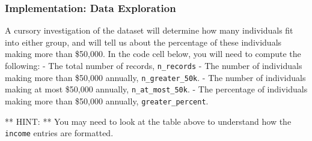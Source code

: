\documentclass[11pt]{article}
\begin{document}
    
    \subsubsection{Implementation: Data
Exploration}\label{implementation-data-exploration}

A cursory investigation of the dataset will determine how many
individuals fit into either group, and will tell us about the percentage
of these individuals making more than \$50,000. In the code cell below,
you will need to compute the following: - The total number of records,
\texttt{\textquotesingle{}n\_records\textquotesingle{}} - The number of
individuals making more than \$50,000 annually,
\texttt{\textquotesingle{}n\_greater\_50k\textquotesingle{}}. - The
number of individuals making at most \$50,000 annually,
\texttt{\textquotesingle{}n\_at\_most\_50k\textquotesingle{}}. - The
percentage of individuals making more than \$50,000 annually,
\texttt{\textquotesingle{}greater\_percent\textquotesingle{}}.

** HINT: ** You may need to look at the table above to understand how
the \texttt{\textquotesingle{}income\textquotesingle{}} entries are
formatted.
\end{document}
